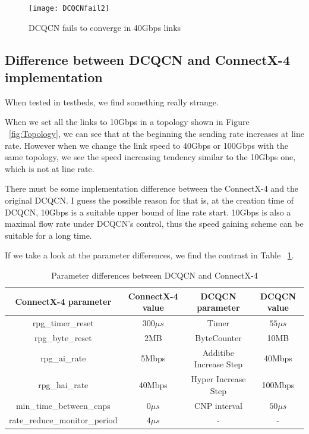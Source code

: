 \documentclass[12pt,a4paper]{article}
\begin{document}
\begin{figure}[h!]
	\begin{center}
		\texttt{[image: DCQCNfail2]}
		\caption{DCQCN fails to converge in 40Gbps links}
		\label{fig:DCQCNfail2}
	\end{center}
\end{figure}

\subsection{Difference between DCQCN and ConnectX-4 implementation}

When tested in testbeds, we find something really strange.

When we set all the links to 10Gbps in a topology shown in Figure ~\ref{fig:Topology},
we can see that at the beginning the sending rate increases at line rate.
However when we change the link speed to 40Gbps or 100Gbps with the same topology,
we see the speed increasing tendency similar to the 10Gbps one, which is not at line rate.

There must be some implementation difference between the ConnectX-4 and the original DCQCN.
I guess the possible reason for that is, at the creation time of DCQCN, 10Gbps is a suitable upper bound of line rate start.
10Gbps is also a maximal flow rate under DCQCN's control, thus the speed gaining scheme can be suitable for a long time.

If we take a look at the parameter differences, we find the contrast in Table ~\ref{tab:contrast}.
\begin{table}[h!]
	\begin{center}
		\caption{Parameter differences between DCQCN and ConnectX-4}
		\label{tab:contrast}
		\begin{tabular}{|c|c|c|c|}
			\hline
			ConnectX-4 parameter & ConnectX-4 value & DCQCN parameter & DCQCN value\\
			\hline
			rpg\_timer\_reset & $300\mu s$ & Timer & $55 \mu s$\\
			\hline
			rpg\_byte\_reset & 2MB & ByteCounter & 10MB\\
			\hline
			rpg\_ai\_rate & 5Mbps & Additibe Increase Step & 40Mbps\\
			\hline
			rpg\_hai\_rate & 40Mbps & Hyper Increase Step & 100Mbps\\
			\hline
			min\_time\_between\_cnps & $0\mu s$ & CNP interval & $50\mu s$\\
			\hline
			rate\_reduce\_monitor\_period & $4\mu s$ & - & - \\
			\hline
		\end{tabular}
	\end{center}
\end{table}
\end{document}
